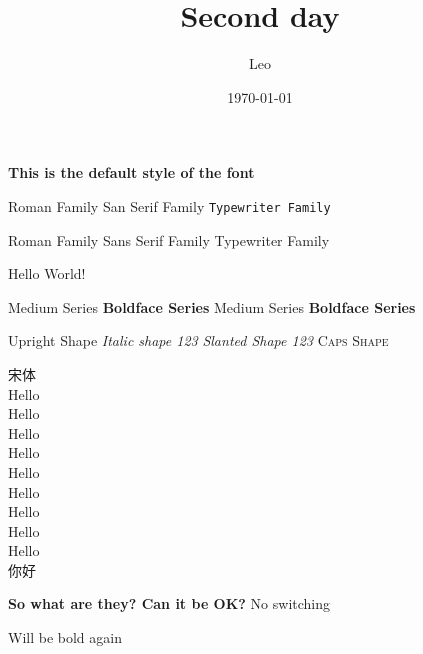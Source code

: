 \documentclass{article}
\title{Second day}
\author{Leo}
\date{\today}
\begin{document}
\maketitle

\textsf{\textbf{
    This is the default style of the font
}}


\textrm{Roman Family} \textsf{San Serif Family} \texttt{Typewriter Family}


{\rmfamily Roman Family} {\sffamily Sans Serif Family} {\ttfamily Typewriter Family}

\sffamily Hello World!

\textmd{Medium Series} \textbf{Boldface Series}
{\mdseries Medium Series} {\bfseries Boldface Series}

\textup{Upright Shape} \textit{Italic shape 123}
{\slshape Slanted Shape 123} {\scshape Caps Shape}

{\songti 宋体}\\
{\tiny Hello} \\
{\scriptsize Hello} \\
{\footnotesize Hello} \\
{\small Hello} \\
{\normalsize Hello} \\
{\large Hello} \\
{\LARGE Hello} \\
{\huge Hello} \\
{\Huge Hello} \\
{你好}


{\bfseries
So what are they?
Can it be OK?
}
No switching

Will be bold again
\end{document}
